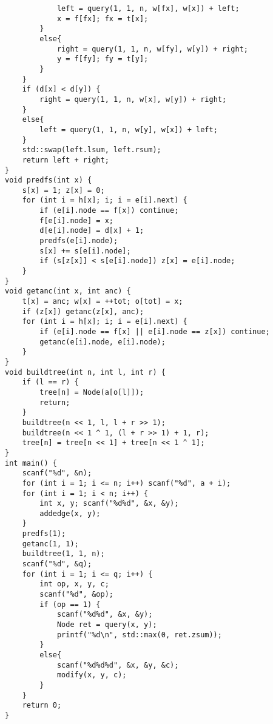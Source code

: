 \begin{lstlisting}
			left = query(1, 1, n, w[fx], w[x]) + left;
			x = f[fx]; fx = t[x];
		}
		else{
			right = query(1, 1, n, w[fy], w[y]) + right;
			y = f[fy]; fy = t[y];
		}
	}
	if (d[x] < d[y]) {
		right = query(1, 1, n, w[x], w[y]) + right;
	}
	else{
		left = query(1, 1, n, w[y], w[x]) + left;
	}
	std::swap(left.lsum, left.rsum);
	return left + right;
}
void predfs(int x) {
	s[x] = 1; z[x] = 0;
	for (int i = h[x]; i; i = e[i].next) {
		if (e[i].node == f[x]) continue;
		f[e[i].node] = x;
		d[e[i].node] = d[x] + 1;
		predfs(e[i].node);
		s[x] += s[e[i].node];
		if (s[z[x]] < s[e[i].node]) z[x] = e[i].node;
	}
}
void getanc(int x, int anc) {
	t[x] = anc; w[x] = ++tot; o[tot] = x;
	if (z[x]) getanc(z[x], anc);
	for (int i = h[x]; i; i = e[i].next) {
		if (e[i].node == f[x] || e[i].node == z[x]) continue;
		getanc(e[i].node, e[i].node);
	}
}
void buildtree(int n, int l, int r) {
	if (l == r) {
		tree[n] = Node(a[o[l]]);
		return;
	}
	buildtree(n << 1, l, l + r >> 1);
	buildtree(n << 1 ^ 1, (l + r >> 1) + 1, r);
	tree[n] = tree[n << 1] + tree[n << 1 ^ 1];
}
int main() {
	scanf("%d", &n);
	for (int i = 1; i <= n; i++) scanf("%d", a + i);
	for (int i = 1; i < n; i++) {
		int x, y; scanf("%d%d", &x, &y);
		addedge(x, y);
	}
	predfs(1);
	getanc(1, 1);
	buildtree(1, 1, n);
	scanf("%d", &q);
	for (int i = 1; i <= q; i++) {
		int op, x, y, c;
		scanf("%d", &op);
		if (op == 1) {
			scanf("%d%d", &x, &y);
			Node ret = query(x, y);
			printf("%d\n", std::max(0, ret.zsum));
		}
		else{
			scanf("%d%d%d", &x, &y, &c);
			modify(x, y, c);
		}
	}
	return 0;
}
\end{lstlisting}

